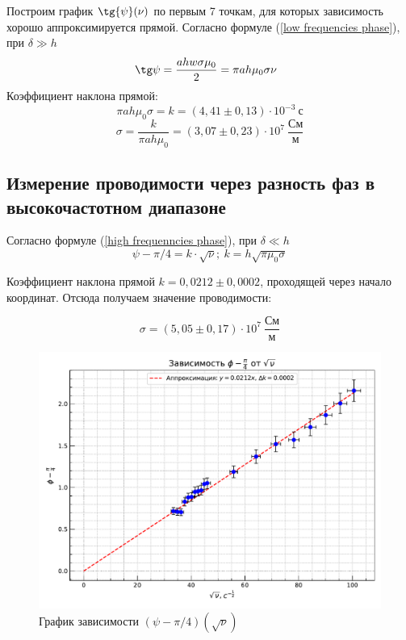 \documentclass[a4paper, 12pt]{article} %
\begin{document}
	Построим график $\tg{\psi} (\nu)$ по первым 7 точкам, для которых зависимость хорошо аппроксимируется прямой.
	Согласно формуле (\ref{low frequencies phase}), при $\delta \gg h$
	\begin{equation*}
		\tg \psi = \frac{ahw \sigma \mu_0}{2} = \pi ah\mu_0\sigma \nu \ \
	\end{equation*}
	Коэффициент наклона прямой: \[\pi ah \mu_0\sigma = k = (4,41 \pm 0,13) \cdot 10^{-3} \ \text{с}\]
	\[\sigma = \frac{k}{\pi ah \mu_0} = (3,07 \pm 0,23) \cdot 10^7 \ \frac{\text{См}}{\text{м}}\]

    \newpage

	\subsection{Измерение проводимости через разность фаз в высокочастотном диапазоне}
	Согласно формуле (\ref{high frequenncies phase}), при $\delta \ll h$
	\begin{equation*}
		\psi - \pi/4 = k\cdot \sqrt{\nu}; \ k = h\sqrt{\pi\mu_0\sigma}
	\end{equation*}
	
	Коэффициент наклона прямой $k = 0,0212 \pm 0,0002$, проходящей через начало координат. Отсюда получаем значение проводимости:
	
	\begin{equation}
		\sigma = (5,05 \pm 0,17) \cdot 10^7 \ \frac{\text{См}}{\text{м}}
	\end{equation}
	
	\begin{figure}[h!]
		\centering
		\includegraphics[width=\textwidth]{high frequencies.pdf}
		\caption{График зависимости $(\psi - \pi/4)(\sqrt{\nu})$}
        \label{high frequencies}
	\end{figure}
	
\end{document}
